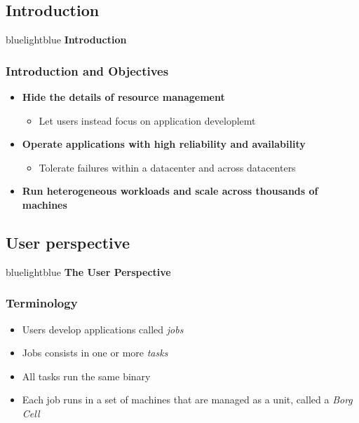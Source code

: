 \subsection{Introduction}
\begin{frame}
 \begin{colorblock}{blue}{lightblue}{ }
    \Large \textbf{Introduction}
  \end{colorblock}
\end{frame}

\begin{frame}
\frametitle{Introduction and Objectives}
\begin{itemize}
	\item {\bf Hide the details of resource management}
	\begin{itemize}
		\item Let users instead focus on application developlemt
	\end{itemize}
	\item {\bf Operate applications with high reliability and availability}
	\begin{itemize}
		\item Tolerate failures within a datacenter and across datacenters
	\end{itemize}
	\item {\bf Run heterogeneous workloads and scale across thousands of machines}
\end{itemize}
\end{frame}

\subsection{User perspective}
\begin{frame}
 \begin{colorblock}{blue}{lightblue}{ }
    \Large \textbf{The User Perspective}
  \end{colorblock}
\end{frame}

\begin{frame}
\frametitle{Terminology}
\begin{itemize}
	\item Users develop applications called {\it jobs}
	\item Jobs consists in one or more {\it tasks}
	\item All tasks run the same binary
	\item Each job runs in a set of machines that are managed as a unit, called a {\it Borg Cell}
\end{itemize}
\end{frame}

